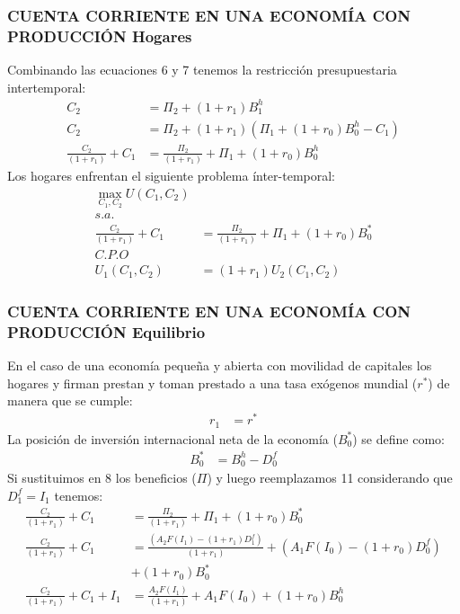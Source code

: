 \documentclass[10pt, xcolor=table, x11names]{beamer}
\begin{document}
\begin{frame}[label=7]
	\frametitle{{\normalsize CUENTA CORRIENTE EN UNA ECONOMÍA CON PRODUCCIÓN } {Hogares}}
	Combinando las ecuaciones 6 y 7 tenemos la restricción presupuestaria intertemporal:
	\begin{align}
	 C_{2}&=\Pi_{2}+(1+r_{1})B_{1}^{h}\nonumber \\
	C_{2}&=\Pi_{2}+(1+r_{1})(\Pi_{1}+(1+r_{0})B_{0}^{h}-C_{1})\nonumber \\
	\frac{C_{2}}{(1+r_{1})}+C_{1}&=\frac{\Pi_{2}}{(1+r_{1})}+\Pi_{1}+(1+r_{0})B_{0}^{h}
	\end{align}
	Los hogares enfrentan el siguiente problema ínter-temporal:
	\begin{align}
	\max_{C_{1}, C_{2}} U(C_{1}, C_{2})\nonumber \\
	s.a.\nonumber \\
	\frac{C_{2}}{(1+r_{1})}+C_{1}&=\frac{\Pi_{2}}{(1+r_{1})}+\Pi_{1} +(1+r_{0})B_{0}^{*}\nonumber \\
	C.P.O\nonumber \\
	U_{1}(C_{1}, C_{2})&=(1+r_{1})U_{2}(C_{1}, C_{2}) 
	\end{align}
\end{frame}

\begin{frame}[label=8]
	\frametitle{{\normalsize CUENTA CORRIENTE EN UNA ECONOMÍA CON PRODUCCIÓN } {Equilibrio}}
	En el caso de una economía pequeña y abierta con movilidad de capitales los hogares y firman prestan y toman prestado a una tasa exógenos mundial ($ r^{*}$) de manera que se cumple:
	\begin{align}
		r_{1}&=r^{*}
	\end{align}
	La posición de inversión internacional neta de la economía ($B_{0}^{*} $) se define como:
		\begin{align}
			B_{0}^{*}&=B_{0}^{h}-D_{0}^{f}
		\end{align}
	Si sustituimos en 8 los beneficios ($\Pi $) y luego reemplazamos 11 considerando que $D_{1}^{f}=I_{1} $ tenemos:
	 \begin{align}
	 	\frac{C_{2}}{(1+r_{1})}+C_{1}&=\frac{\Pi_{2}}{(1+r_{1})}+\Pi_{1} +(1+r_{0})B_{0}^{*}\nonumber \\
	 \frac{C_{2}}{(1+r_{1})}+C_{1}&=\frac{(A_{2}F(I_{1})-(1+r_{1})D_{1}^{f})}{(1+r_{1})}+(A_{1}F(I_{0})-(1+r_{0})D_{0}^{f}) \nonumber \\
	 &+(1+r_{0})B_{0}^{*}\nonumber \\
	 \frac{C_{2}}{(1+r_{1})}+C_{1}+I_{1}&=\frac{A_{2}F(I_{1})}{(1+r_{1})}+A_{1}F(I_{0})+(1+r_{0})B_{0}^{h}
	 \end{align}
\end{frame}
\end{document}
